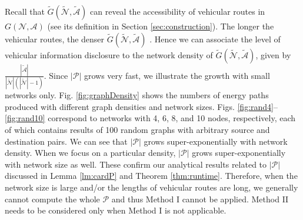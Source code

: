 \documentclass[journal]{IEEEtran}
\begin{document}
\begin{figure*}[!t]
	\begin{center}
	\end{center}
	\caption{Number of energy paths produced with different graph density and network size.}
  \label{fig:graphDensity}
\end{figure*}
Recall that $\tilde{G}(\tilde{\mathcal{N}},\tilde{\mathcal{A}})$ can reveal the accessibility of vehicular routes in $G(\mathcal{N},\mathcal{A})$ (see its definition in Section \ref{sec:construction}).
The longer the vehicular routes, the denser $\tilde{G}(\tilde{\mathcal{N}},\tilde{\mathcal{A}})$ . Hence we can associate the level of vehicular information disclosure to the network density of  $\tilde{G}(\tilde{\mathcal{N}},\tilde{\mathcal{A}})$, given by $\frac{|\tilde{\mathcal{A}}|}{|\tilde{\mathcal{N}}|(|\tilde{\mathcal{N}}|-1)}$. 
Since $|\mathcal{P}|$ grows very fast, we illustrate the growth with small networks only.
Fig. \ref{fig:graphDensity} shows the numbers of energy paths produced with different graph densities and network sizes. Figs. \ref{fig:rand4}--\ref{fig:rand10} correspond to networks with 4, 6, 8, and 10 nodes, respectively, each of which contains results of 100 random graphs with arbitrary source and destination pairs. We can see that $|\mathcal{P}|$ grows super-exponentially with network density. When we focus on a particular density, $|\mathcal{P}|$ grows  super-exponentially with network size as well. These confirm our analytical results related to $|\mathcal{P}|$ discussed in Lemma \ref{lm:cardP} and Theorem \ref{thm:runtime}. Therefore, when the network size is large and/or the lengths of vehicular routes are long, we generally cannot compute the whole $\mathcal{P}$ and thus Method I cannot be applied. Method II needs to be considered only when Method I is not applicable.
\end{document}
